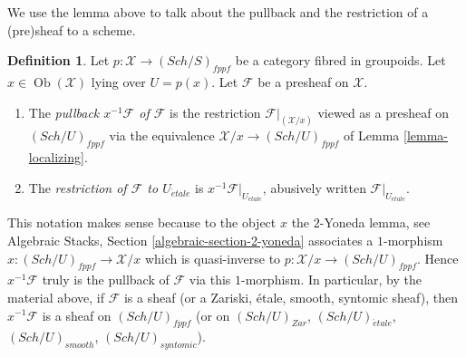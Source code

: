 \documentclass{stacks-project}
\theoremstyle{plain}
\theoremstyle{definition}
\newtheorem{definition}[subsection]{Definition}
\theoremstyle{remark}
\numberwithin{equation}{subsection}
\def\Sch{\mathit{Sch}}
\def\Ob{\mathop{\mathrm{Ob}}\nolimits}
\def\etale{{\acute{e}tale}}
\begin{document}
\noindent
We use the lemma above to talk about the pullback and the restriction
of a (pre)sheaf to a scheme.

\begin{definition}
\label{definition-pullback}
Let $p : \mathcal{X} \to (\Sch/S)_{fppf}$ be a category fibred
in groupoids. Let $x \in \Ob(\mathcal{X})$ lying over $U = p(x)$.
Let $\mathcal{F}$ be a presheaf on $\mathcal{X}$.
\begin{enumerate}
\item The {\it pullback $x^{-1}\mathcal{F}$ of $\mathcal{F}$} is the
restriction $\mathcal{F}|_{(\mathcal{X}/x)}$ viewed as a presheaf on
$(\Sch/U)_{fppf}$ via the equivalence
$\mathcal{X}/x \to (\Sch/U)_{fppf}$ of
Lemma \ref{lemma-localizing}.
\item The {\it restriction of $\mathcal{F}$ to $U_\etale$}
is $x^{-1}\mathcal{F}|_{U_\etale}$, abusively written
$\mathcal{F}|_{U_\etale}$.
\end{enumerate}
\end{definition}

\noindent
This notation makes sense because to the object $x$ the $2$-Yoneda lemma, see
Algebraic Stacks, Section \ref{algebraic-section-2-yoneda}
associates a $1$-morphism $x : (\Sch/U)_{fppf} \to \mathcal{X}/x$
which is quasi-inverse to $p : \mathcal{X}/x \to (\Sch/U)_{fppf}$.
Hence $x^{-1}\mathcal{F}$ truly is the pullback of $\mathcal{F}$ via this
$1$-morphism. In particular, by the material above, if $\mathcal{F}$
is a sheaf (or a Zariski, \'etale, smooth, syntomic sheaf), then
$x^{-1}\mathcal{F}$ is a sheaf on $(\Sch/U)_{fppf}$ (or on
$(\Sch/U)_{Zar}$, $(\Sch/U)_\etale$,
$(\Sch/U)_{smooth}$, $(\Sch/U)_{syntomic}$).
\end{document}
